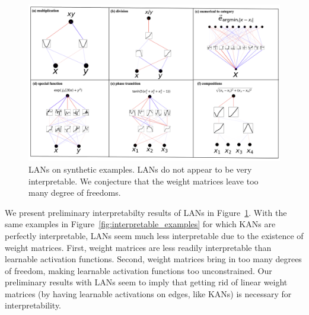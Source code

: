 \documentclass{article}
\numberwithin{equation}{section}
\numberwithin{figure}{section}
\begin{document}
\begin{figure}[t]
    \centering
    \includegraphics[width=1\linewidth]{figs/lan_interpretable_examples.png}
    \caption{LANs on synthetic examples. LANs do not appear to be very interpretable. We conjecture that the weight matrices leave too many degree of freedoms.}
    \label{fig:lan_interp_example}
\end{figure}


We present preliminary interpretabilty results of LANs in Figure~\ref{fig:lan_interp_example}. With the same examples in Figure~\ref{fig:interpretable_examples} for which KANs are perfectly interpretable, LANs seem much less interpretable due to the existence of weight matrices. First, weight matrices are less readily interpretable than learnable activation functions. Second, weight matrices bring in too many degrees of freedom, making learnable activation functions too unconstrained. Our preliminary results with LANs seem to imply that getting rid of linear weight matrices (by having learnable activations on edges, like KANs) is necessary for interpretability.
\end{document}
